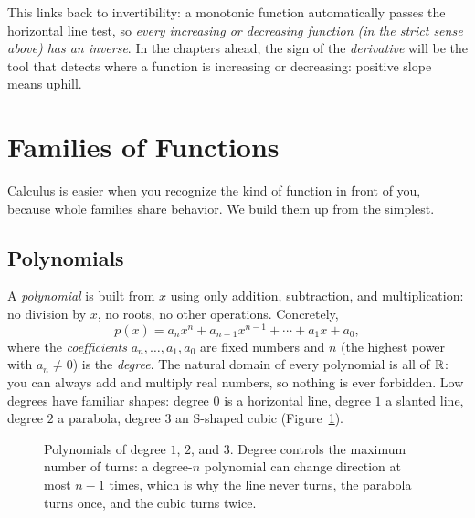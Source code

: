 \begin{connectionbox}
This links back to invertibility: a monotonic function automatically passes the
horizontal line test, so \emph{every increasing or decreasing function (in the
strict sense above) has an inverse}. In the chapters ahead, the
sign of the \emph{derivative} will be the tool that detects where a
function is increasing or decreasing: positive slope means uphill.
\end{connectionbox}

\section{Families of Functions}
\label{ch02:families}

Calculus is easier when you recognize the kind of function in front of you,
because whole families share behavior. We build them up from the simplest.

\subsection{Polynomials}

A \emph{polynomial} is built from $x$ using only addition, subtraction, and
multiplication: no division by $x$, no roots, no other operations. Concretely,
\[
  p(x) = a_n x^n + a_{n-1} x^{n-1} + \cdots + a_1 x + a_0,
\]
where the \emph{coefficients} $a_n, \dots, a_1, a_0$ are fixed numbers and $n$ (the highest power with
$a_n\ne 0$) is the \emph{degree}. The natural domain of every polynomial is all of
$\mathbb{R}$: you can always add and multiply real numbers, so nothing is ever forbidden.
Low degrees have familiar shapes: degree $0$ is a horizontal line, degree $1$ a
slanted line, degree $2$ a parabola, degree $3$ an S-shaped cubic
(Figure~\ref{ch02:fig-polynomials}).

\begin{figure}[htbp]
\centering
{}
\caption{Polynomials of degree $1$, $2$, and $3$. Degree controls the maximum
number of turns: a degree-$n$ polynomial can change direction at most $n-1$ times,
which is why the line never turns, the parabola turns once, and the cubic turns
twice.}
\label{ch02:fig-polynomials}
\end{figure}

